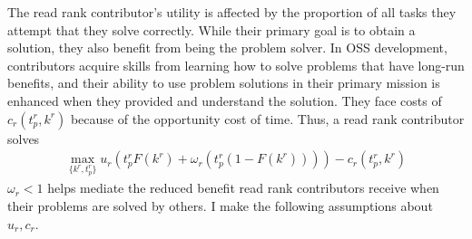 \documentclass[source/paper/main.tex]{subfiles}
\begin{document}
\qquad The read rank contributor's utility is affected by the proportion of all tasks they attempt that they solve correctly. While their primary goal is to obtain a solution, they also benefit from being the problem solver. In OSS development, contributors acquire skills from learning how to solve problems that have long-run benefits, and their ability to use problem solutions in their primary mission is enhanced when they provided and understand the solution. They face costs of $c_r(t_p^r, k^r)$ because of the opportunity cost of time. Thus, a read rank contributor solves 
\begin{align}
    \max_{\{k^r, t_p^r\}} u_r\left(t_p^rF(k^r) + \omega_r(t_p^r (1-F(k^r))) \right) - c_r(t_p^r, k^r) \label{read_rank_problem}
\end{align}
$\omega_r < 1$ helps mediate the reduced benefit read rank contributors receive when their problems are solved by others. 
I make the following assumptions about $u_r, c_r$. 
\end{document}

